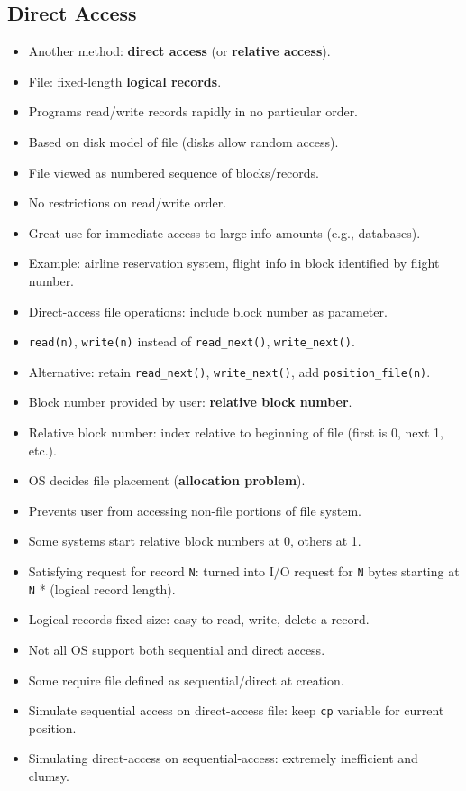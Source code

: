 \subsection*{Direct Access}
\begin{itemize}
    \item Another method: \textbf{direct access} (or \textbf{relative access}).
    \item File: fixed-length \textbf{logical records}.
    \item Programs read/write records rapidly in no particular order.
    \item Based on disk model of file (disks allow random access).
    \item File viewed as numbered sequence of blocks/records.
    \item No restrictions on read/write order.
    \item Great use for immediate access to large info amounts (e.g., databases).
    \item Example: airline reservation system, flight info in block identified by flight number.
    \item Direct-access file operations: include block number as parameter.
    \item \texttt{read(n)}, \texttt{write(n)} instead of \texttt{read\_next()}, \texttt{write\_next()}.
    \item Alternative: retain \texttt{read\_next()}, \texttt{write\_next()}, add \texttt{position\_file(n)}.
    \item Block number provided by user: \textbf{relative block number}.
    \item Relative block number: index relative to beginning of file (first is 0, next 1, etc.).
    \item OS decides file placement (\textbf{allocation problem}).
    \item Prevents user from accessing non-file portions of file system.
    \item Some systems start relative block numbers at 0, others at 1.
    \item Satisfying request for record \texttt{N}: turned into I/O request for \texttt{N} bytes starting at \texttt{N} * (logical record length).
    \item Logical records fixed size: easy to read, write, delete a record.
    \item Not all OS support both sequential and direct access.
    \item Some require file defined as sequential/direct at creation.
    \item Simulate sequential access on direct-access file: keep \texttt{cp} variable for current position.
    \item Simulating direct-access on sequential-access: extremely inefficient and clumsy.
\end{itemize}

